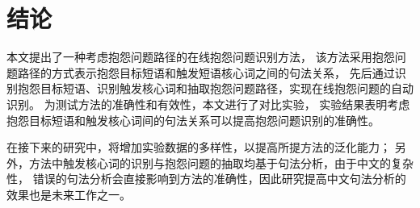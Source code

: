 \section{结论}\label{sec:1.5}
本文提出了一种考虑抱怨问题路径的在线抱怨问题识别方法，
该方法采用抱怨问题路径的方式表示抱怨目标短语和触发短语核心词之间的句法关系，
先后通过识别抱怨目标短语、识别触发核心词和抽取抱怨问题路径，实现在线抱怨问题的自动识别。
为测试方法的准确性和有效性，本文进行了对比实验，
实验结果表明考虑抱怨目标短语和触发核心词间的句法关系可以提高抱怨问题识别的准确性。

在接下来的研究中，将增加实验数据的多样性，以提高所提方法的泛化能力；
另外，方法中触发核心词的识别与抱怨问题的抽取均基于句法分析，由于中文的复杂性，
错误的句法分析会直接影响到方法的准确性，因此研究提高中文句法分析的效果也是未来工作之一。
